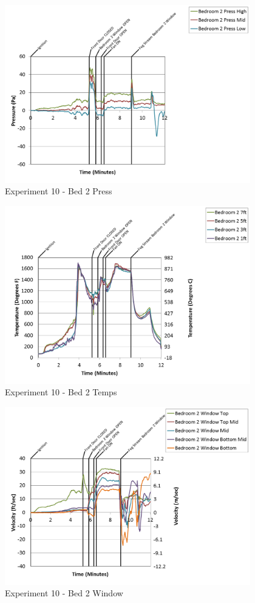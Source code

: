 \documentclass{article}
\begin{document}
\begin{appendices}
\begin{figure}[h!]
	\centering
	\includegraphics[height=3.05in]{0_Images/Results_Charts/Exp_10_Charts/Bed2Press.png}
	\caption{Experiment 10 - Bed 2 Press}
\end{figure}

\clearpage

\begin{figure}[h!]
	\centering
	\includegraphics[height=3.05in]{0_Images/Results_Charts/Exp_10_Charts/Bed2Temps.png}
	\caption{Experiment 10 - Bed 2 Temps}
\end{figure}


\begin{figure}[h!]
	\centering
	\includegraphics[height=3.05in]{0_Images/Results_Charts/Exp_10_Charts/Bed2Window.png}
	\caption{Experiment 10 - Bed 2 Window}
\end{figure}


\end{appendices}
\end{document}
